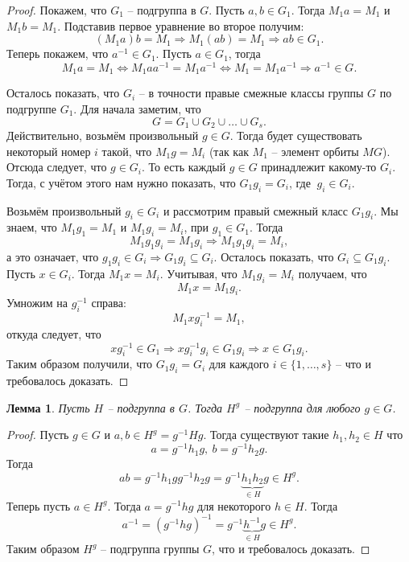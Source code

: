 \documentclass{article}
\newtheorem{lemma}{Лемма}[section]
\begin{document}
\begin{proof}
    Покажем, что $G_1$ -- подгруппа в $G$. Пусть $a, b \in G_1$. Тогда $M_1 a = M_1$ и $M_1 b = M_1$. Подставив первое уравнение во второе получим: $$ (M_1 a) b = M_1 \Rightarrow M_1(ab) = M_1 \Rightarrow ab \in G_1. $$
    Теперь покажем, что $a^{-1} \in G_1$. Пусть $a \in G_1$, тогда $$ M_1 a = M_1 \Leftrightarrow M_1 a a^{-1} = M_1 a^{-1} \Leftrightarrow M_1 = M_1 a^{-1} \Rightarrow a^{-1} \in G. $$

    Осталось показать, что $G_i$ -- в точности правые смежные классы группы $G$ по подгруппе $G_1$. Для начала заметим, что $$ G = G_1 \cup G_2 \cup \ldots \cup G_s. $$ Действительно, возьмём произвольный $g \in G$. Тогда будет существовать некоторый номер $i$ такой, что $M_1 g = M_i$ (так как $M_1$ -- элемент орбиты $MG$). Отсюда следует, что $g \in G_i$. То есть каждый $g \in G$ принадлежит какому-то $G_i$. Тогда, с учётом этого нам нужно показать, что $G_1 g_i = G_i$, где $\ g_i \in G_i$.
    
    Возьмём произвольный $g_i \in G_i$ и рассмотрим правый смежный класс $G_1 g_i$. Мы знаем, что $M_1 g_1 = M_1$ и $M_1 g_i = M_i$, при $g_1 \in G_1$. Тогда $$ M_1 g_1 g_i = M_1 g_i \Rightarrow M_1 g_1 g_i = M_i, $$ а это означает, что $g_1 g_i \in G_i \Rightarrow G_1 g_i \subseteq G_i$.
    Осталось показать, что $G_i \subseteq G_1 g_i$. Пусть $x \in G_i$. Тогда $M_1 x = M_i$. Учитывая, что $M_1 g_i = M_i$ получаем, что $$ M_1 x = M_1 g_i. $$ Умножим на $g_i^{-1}$ справа: $$ M_1 x g_i^{-1} = M_1, $$ откуда следует, что $$x g_i^{-1} \in G_1 \Rightarrow x g_i^{-1} g_i \in G_1 g_i \Rightarrow x \in G_1 g_i. $$ Таким образом получили, что $G_1 g_i = G_i$ для каждого $i \in \{ 1, \ldots, s\} $ -- что и требовалось доказать.
\end{proof}

\begin{lemma} \label{qxbn}
    Пусть $H$ -- подгруппа в $G$. Тогда $H^g$ -- подгруппа для любого $g \in G$.
\end{lemma}
\begin{proof}
    Пусть $g \in G$ и $a, b \in H^g = g^{-1} H g $. Тогда существуют такие $h_1, h_2 \in H$ что $$ a = g^{-1} h_1 g, \ b = g^{-1} h_2 g. $$ Тогда $$ ab =  g^{-1} h_1 g g^{-1} h_2 g = g^{-1} \underbrace{h_1 h_2}_{\in H} g \in H^g. $$ Теперь пусть $a \in H^g$. Тогда $a = g^{-1} h g$ для некоторого $h \in H$. Тогда $$ a^{-1} = (g^{-1} h g)^{-1} = g^{-1} \underbrace{h^{-1}}_{\in H} g \in H^g. $$
    Таким образом $H^g$ -- подгруппа группы $G$, что и требовалось доказать.
\end{proof}
\end{document}
